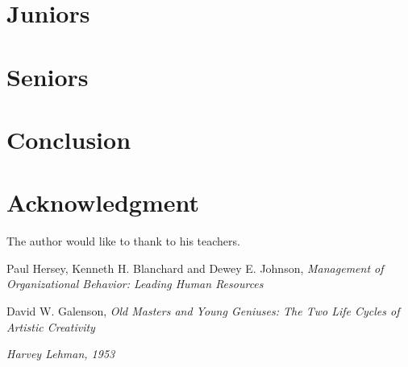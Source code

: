 \documentclass[conference]{IEEEtran}
\begin{document}
\newpage
\section{Juniors}
\section{Seniors}

\newpage
\section{Conclusion}

\section*{Acknowledgment}
The author would like to thank to his teachers.

\newpage
\begin{thebibliography}{99}


Paul Hersey, Kenneth H. Blanchard and Dewey E. Johnson, \emph{Management of Organizational Behavior: Leading Human Resources}

David W. Galenson, \emph{Old Masters and Young Geniuses: The Two Life Cycles of Artistic Creativity}

\emph{Harvey Lehman, 1953} 

\end{thebibliography}
\end{document}

